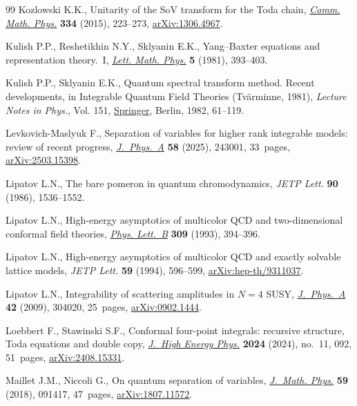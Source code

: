 \begin{thebibliography}{99}
Kozlowski K.K., Unitarity of the {S}o{V} transform for the {T}oda chain,
 \href{https://doi.org/10.1007/s00220-014-2134-6}{\textit{Comm. Math. Phys.}}
 \textbf{334} (2015), 223--273,
 \href{http://arxiv.org/abs/1306.4967}{arXiv:1306.4967}.

Kulish P.P., Reshetikhin N.Y., Sklyanin E.K., {Y}ang--{B}axter equations and
 representation theory.~{I},
 \href{https://doi.org/10.1007/BF02285311}{\textit{Lett. Math. Phys.}}
 \textbf{5} (1981), 393--403.

Kulish P.P., Sklyanin E.K., Quantum spectral transform method. {R}ecent
 developments, in Integrable Quantum Field Theories ({T}v\"arminne, 1981),
 \textit{Lecture Notes in Phys.}, Vol. 151,
 \href{https://doi.org/10.1007/3-540-11190-5_8}{Springer}, Berlin, 1982,
 61--119.

Levkovich-Maslyuk F., Separation of variables for higher rank integrable
 models: review of recent progress,
 \href{https://doi.org/10.1088/1751-8121/ade103}{\textit{J.~Phys.~A}}
 \textbf{58} (2025), 243001, 33~pages,
 \href{http://arxiv.org/abs/2503.15398}{arXiv:2503.15398}.

Lipatov L.N., The bare pomeron in quantum chromodynamics, \textit{JETP Lett.}
 \textbf{90} (1986), 1536--1552.

Lipatov L.N., High-energy asymptotics of multicolor {QCD} and two-dimensional
 conformal field theories,
 \href{https://doi.org/10.1016/0370-2693(93)90951-D}{\textit{Phys. Lett.~B}}
 \textbf{309} (1993), 394--396.

Lipatov L.N., High-energy asymptotics of multicolor {QCD} and exactly solvable
 lattice models, \textit{JETP Lett.} \textbf{59} (1994), 596--599,
 \href{http://arxiv.org/abs/hep-th/9311037}{arXiv:hep-th/9311037}.

Lipatov L.N., Integrability of scattering amplitudes in {$N=4$} {SUSY},
 \href{https://doi.org/10.1088/1751-8113/42/30/304020}{\textit{J.~Phys.~A}}
 \textbf{42} (2009), 304020, 25~pages,
 \href{http://arxiv.org/abs/0902.1444}{arXiv:0902.1444}.

Loebbert F., Stawinski S.F., Conformal four-point integrals: recursive
 structure, {T}oda equations and double copy,
 \href{https://doi.org/10.1007/jhep11(2024)092}{\textit{J.~High Energy Phys.}}
 \textbf{2024} (2024), no.~11, 092, 51~pages,
 \href{http://arxiv.org/abs/2408.15331}{arXiv:2408.15331}.

Maillet J.M., Niccoli G., On quantum separation of variables,
 \href{https://doi.org/10.1063/1.5050989}{\textit{J.~Math. Phys.}} \textbf{59}
 (2018), 091417, 47~pages,
 \href{http://arxiv.org/abs/1807.11572}{arXiv:1807.11572}.


\end{thebibliography}

